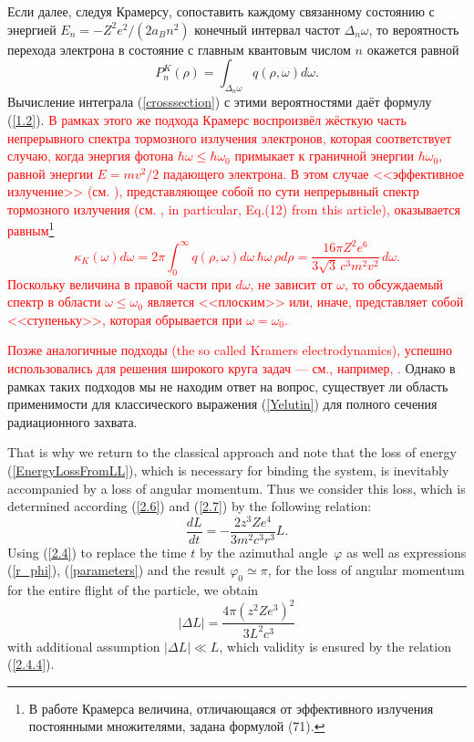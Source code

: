 \documentclass{SovJurn/JETPL}
\begin{document}
Если далее, следуя Крамерсу, сопоставить каждому связанному состоянию с энергией $E_n=-Z^2e^2/(2a_Bn^2)$ конечный интервал частот $\Delta_n\omega$, то вероятность перехода электрона в состояние с главным квантовым числом $n$ окажется равной
\begin{equation}
\label{nprobability}
P^K_n(\rho)=\int_{\Delta_n\omega}q(\rho,\omega)d\omega.
\end{equation}
Вычисление интеграла (\ref{crosssection}) с этими вероятностями даёт формулу (\ref{1.2}).  \textcolor{Red}{В рамках этого же подхода Крамерс воспроизвёл жёсткую часть непрерывного спектра тормозного излучения электронов, которая соответствует случаю, когда энергия фотона $\hbar\omega\le \hbar\omega_0$ примыкает к граничной энергии $\hbar\omega_0$, равной энергии $E=mv^2/2$ падающего электрона. В этом случае <<эффективное излучение>> (см. \cite{landau1975classical}), представляющее собой по сути непрерывный спектр тормозного излучения (см. \cite{KoganPlanckConstant}, in particular, Eq.(12) from this article), оказывается равным}\footnote{В работе Крамерса \cite{kramers1923xciii} величина, отличающаяся от эффективного излучения постоянными множителями, задана формулой (71).}
\textcolor{Red}{
\begin{equation}
\label{effrad}
\kappa_K(\omega)d\omega=2\pi \int_0^{\infty} q(\rho,\omega)d\omega\, \hbar\omega\, \rho d\rho=
\frac{16\pi Z^2e^6}{3\sqrt{3}\,c^3m^2v^2}\,d\omega.
\end{equation}
Поскольку величина в правой части при $d\omega$, не зависит от $\omega$, то обсуждаемый спектр в области $\omega\le\omega_0$ является <<плоским>> или, иначе, представляет собой <<ступеньку>>, которая обрывается при $\omega=\omega_0$.} 

\textcolor{Red}{Позже аналогичные подходы (the so called Kramers electrodynamics), успешно использовались для решения широкого круга задач --- см., например, \cite{KoganPlanckConstant,kogan1992kramers}.} Однако в  рамках таких подходов мы не находим ответ на вопрос, существует ли область применимости для классического выражения (\ref{Yelutin}) для полного сечения радиационного захвата.

That is why we return to the classical approach and note that the loss of energy (\ref{EnergyLossFromLL}), which is necessary for binding the system, is inevitably accompanied by a loss of angular momentum. Thus we consider this loss, which is determined according (\ref{2.6}) and (\ref{2.7}) by the following relation:
\begin{equation}
\frac{dL}{dt}=-\dfrac{2z^3Ze^4}{3m^2c^3r^3}L.
\label{brem_an_mom}
\end{equation}
Using (\ref{2.4}) to replace the time $t$ by the azimuthal angle~$\varphi$ as well as expressions (\ref{r_phi}), (\ref{parameters}) and the result $\varphi_0\simeq\pi$, for the loss of angular momentum for the entire flight of the particle, we obtain
\begin{equation}
|\Delta L|=\frac{4\pi (z^2Ze^3)^2}{3L^2c^3}
\label{ddl}
\end{equation}
with additional assumption $|\Delta L|\ll L$, which validity is ensured by the relation (\ref{2.4.4}).
\end{document}

